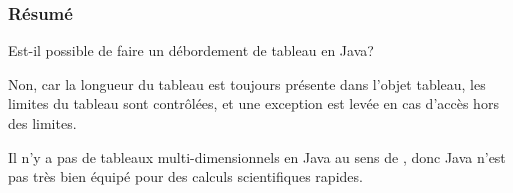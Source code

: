 \subsubsection{Résumé}

Est-il possible de faire un débordement de tableau en Java?

Non, car la longueur du tableau est toujours présente dans l'objet tableau, les limites
du tableau sont contrôlées, et une exception est levée en cas d'accès hors des limites.

Il n'y a pas de tableaux multi-dimensionnels en Java au sens de \CCpp, donc Java
n'est pas très bien équipé pour des calculs scientifiques rapides.

%
